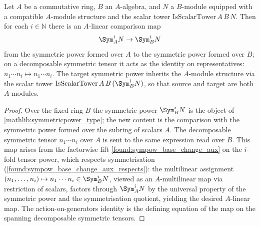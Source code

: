 \begin{lemma}
  \label{found:sympow_base_change_linear}
  Let \(A\) be a commutative ring, \(B\) an \(A\)-algebra, and \(N\) a
  \(B\)-module equipped with a compatible \(A\)-module structure and the scalar
  tower \(\mathrm{IsScalarTower}\,A\,B\,N\).  Then for each \(i\in\mathbb N\)
  there is an \(A\)-linear comparison map
  \[
    \Sym^i_A N\to\Sym^i_B N
  \]
  from the symmetric power formed over \(A\) to the symmetric power formed over
  \(B\); on a decomposable symmetric tensor it acts as the identity on
  representatives: \(n_1\cdots n_i\mapsto n_1\cdots n_i\).  The target symmetric
  power inherits the \(A\)-module structure via the scalar tower
  \(\mathrm{IsScalarTower}\,A\,B\,(\Sym^i_B N)\), so that source and target are
  both \(A\)-modules.
\end{lemma}

\begin{proof}
  \leanok
  Over the fixed ring \(B\) the symmetric power \(\Sym^i_B N\) is the object of
  \cref{mathlib:symmetricpower_type}; the new content is the comparison with the
  symmetric power formed over the subring of scalars \(A\).  The decomposable
  symmetric tensor \(n_1\cdots n_i\) over \(A\) is sent to the same expression
  read over \(B\).  This map arises from the factorwise lift
  \cref{found:sympow_base_change_aux} on the \(i\)-fold tensor power, which respects
  symmetrisation (\cref{found:sympow_base_change_aux_respects}): the multilinear assignment
  \((n_1,\dots,n_i)\mapsto n_1\cdots n_i\in\Sym^i_B N\), viewed as an
  \(A\)-multilinear map via restriction of scalars, factors through \(\Sym^i_A N\)
  by the universal property of the symmetric power and the symmetrisation quotient,
  yielding the desired \(A\)-linear map.  The action-on-generators identity is the
  defining equation of the map on the spanning decomposable symmetric tensors.
\end{proof}

